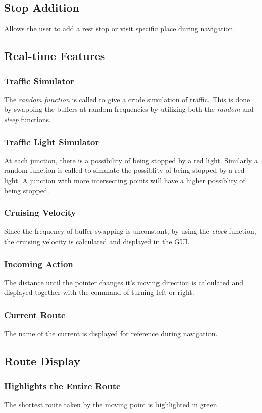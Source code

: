 \documentclass[12pt]{article}
\begin{document}
\subsection{Stop Addition}
Allows the user to add a rest stop or visit specific place during navigation.
\subsection{Real-time Features}
\subsubsection{Traffic Simulator}
The {\it random function} is called to give a crude simulation of traffic. This is done by swapping the buffers at random frequencies by utilizing both the {\it random} and {\it sleep} functions.
\subsubsection{Traffic Light Simulator}
At each junction, there is a possibility of being stopped by a red light. Similarly a random function is called to simulate the possiblity of being stopped by a red light. A junction with more intersecting points will have a higher possiblity of being stopped.
\subsubsection{Cruising Velocity}
Since the frequency of buffer swapping is unconstant, by using the {\it clock} function, the cruising velocity is calculated and displayed in the GUI.
\subsubsection{Incoming Action}
The distance until the pointer changes it's moving direction is calculated and displayed together with the command of turning left or right.
\subsubsection{Current Route}
The name of the current is displayed for reference during navigation.
\subsection{Route Display}
\subsubsection{Highlights the Entire Route}
The shortest route taken by the moving point is highlighted in green.
\end{document}
